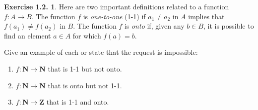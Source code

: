 \documentclass[12pt]{article}
\theoremstyle{definition}
\theoremstyle{exercise}
\newtheorem{exercise}{Exercise 1.2.}
\theoremstyle{solution}
\begin{document}
\begin{exercise}
\label{ex:8}
    Here are two important definitions related to a function \( f : A \to B \). The function \( f \) is \textit{one-to-one} (1-1) if \( a_1 \neq a_2 \) in \( A \) implies that \( f(a_1) \neq f(a_2) \) in \( B \). The function \( f \) is \textit{onto} if, given any \( b \in B \), it is possible to find an element \( a \in A \) for which \( f(a) = b \).

    Give an example of each or state that the request is impossible:
    \begin{enumerate}[label = (\alph*)]
        \item \( f : \mathbf{N} \to \mathbf{N} \) that is 1-1 but not onto.

        \item \( f : \mathbf{N} \to \mathbf{N} \) that is onto but not 1-1.

        \item \( f : \mathbf{N} \to \mathbf{Z} \) that is 1-1 and onto.
    \end{enumerate}
\end{exercise}
\end{document}
